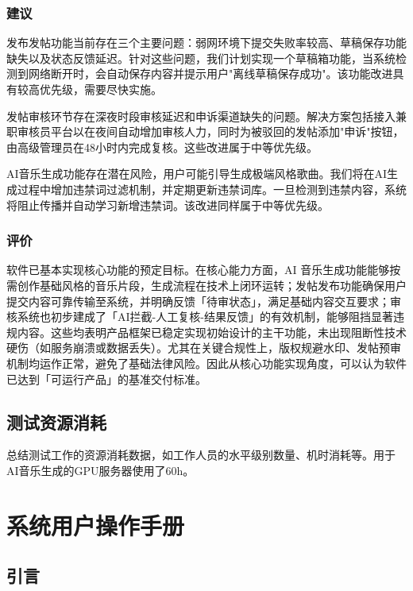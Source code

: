 \documentclass{base}
\numberwithin{figure}{section} %
\begin{document}
\subsubsection{建议}

发布发帖功能当前存在三个主要问题：弱网环境下提交失败率较高、草稿保存功能缺失以及状态反馈延迟。针对这些问题，我们计划实现一个草稿箱功能，当系统检测到网络断开时，会自动保存内容并提示用户"离线草稿保存成功"。该功能改进具有较高优先级，需要尽快实施。

发帖审核环节存在深夜时段审核延迟和申诉渠道缺失的问题。解决方案包括接入兼职审核员平台以在夜间自动增加审核人力，同时为被驳回的发帖添加"申诉"按钮，由高级管理员在48小时内完成复核。这些改进属于中等优先级。

AI音乐生成功能存在潜在风险，用户可能引导生成极端风格歌曲。我们将在AI生成过程中增加违禁词过滤机制，并定期更新违禁词库。一旦检测到违禁内容，系统将阻止传播并自动学习新增违禁词。该改进同样属于中等优先级。

\subsubsection{评价}

软件已基本实现核心功能的预定目标。在核心能力方面，AI 音乐生成功能能够按需创作基础风格的音乐片段，生成流程在技术上闭环运转；发帖发布功能确保用户提交内容可靠传输至系统，并明确反馈「待审状态」，满足基础内容交互要求；审核系统也初步建成了「AI拦截-人工复核-结果反馈」的有效机制，能够阻挡显著违规内容。这些均表明产品框架已稳定实现初始设计的主干功能，未出现阻断性技术硬伤（如服务崩溃或数据丢失）。尤其在关键合规性上，版权规避水印、发帖预审机制均运作正常，避免了基础法律风险。因此从核心功能实现角度，可以认为软件已达到「可运行产品」的基准交付标准。

\subsection{测试资源消耗}

总结测试工作的资源消耗数据，如工作人员的水平级别数量、机时消耗等。用于AI音乐生成的GPU服务器使用了60h。

\newpage

\section{系统用户操作手册}
\subsection{引言}
\end{document}
